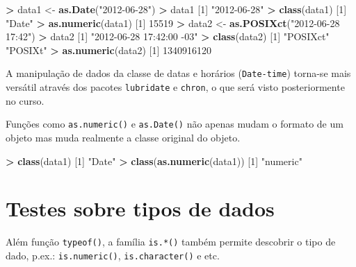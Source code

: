 \documentclass[]{book}
\newenvironment{Shaded}{\begin{snugshade}}{\end{snugshade}}
\newcommand{\KeywordTok}[1]{\textcolor[rgb]{0.13,0.29,0.53}{\textbf{#1}}}
\newcommand{\DecValTok}[1]{\textcolor[rgb]{0.00,0.00,0.81}{#1}}
\newcommand{\StringTok}[1]{\textcolor[rgb]{0.31,0.60,0.02}{#1}}
\newcommand{\OperatorTok}[1]{\textcolor[rgb]{0.81,0.36,0.00}{\textbf{#1}}}
\newcommand{\NormalTok}[1]{#1}
\begin{document}
\begin{Shaded}
\begin{Highlighting}[]
\OperatorTok{>}\StringTok{ }\NormalTok{data1 <-}\StringTok{ }\KeywordTok{as.Date}\NormalTok{(}\StringTok{"2012-06-28"}\NormalTok{)}
\OperatorTok{>}\StringTok{ }\NormalTok{data1}
\NormalTok{[}\DecValTok{1}\NormalTok{] }\StringTok{"2012-06-28"}
\OperatorTok{>}\StringTok{ }\KeywordTok{class}\NormalTok{(data1)}
\NormalTok{[}\DecValTok{1}\NormalTok{] }\StringTok{"Date"}
\OperatorTok{>}\StringTok{ }\KeywordTok{as.numeric}\NormalTok{(data1)}
\NormalTok{[}\DecValTok{1}\NormalTok{] }\DecValTok{15519}
\OperatorTok{>}\StringTok{ }\NormalTok{data2 <-}\StringTok{ }\KeywordTok{as.POSIXct}\NormalTok{(}\StringTok{"2012-06-28 17:42"}\NormalTok{)}
\OperatorTok{>}\StringTok{ }\NormalTok{data2}
\NormalTok{[}\DecValTok{1}\NormalTok{] }\StringTok{"2012-06-28 17:42:00 -03"}
\OperatorTok{>}\StringTok{ }\KeywordTok{class}\NormalTok{(data2)}
\NormalTok{[}\DecValTok{1}\NormalTok{] }\StringTok{"POSIXct"} \StringTok{"POSIXt"} 
\OperatorTok{>}\StringTok{ }\KeywordTok{as.numeric}\NormalTok{(data2)}
\NormalTok{[}\DecValTok{1}\NormalTok{] }\DecValTok{1340916120}
\end{Highlighting}
\end{Shaded}

A manipulação de dados da classe de datas e horários
(\texttt{Date-time}) torna-se mais versátil através dos pacotes
\texttt{lubridate} e \texttt{chron}, o que será visto posteriormente no
curso.

Funções como \texttt{as.numeric()} e \texttt{as.Date()} não apenas mudam
o formato de um objeto mas muda realmente a classe original do objeto.

\begin{Shaded}
\begin{Highlighting}[]
\OperatorTok{>}\StringTok{ }\KeywordTok{class}\NormalTok{(data1)}
\NormalTok{[}\DecValTok{1}\NormalTok{] }\StringTok{"Date"}
\OperatorTok{>}\StringTok{ }\KeywordTok{class}\NormalTok{(}\KeywordTok{as.numeric}\NormalTok{(data1))}
\NormalTok{[}\DecValTok{1}\NormalTok{] }\StringTok{"numeric"}
\end{Highlighting}
\end{Shaded}

\section{Testes sobre tipos de dados}\label{testes-sobre-tipos-de-dados}

Além função \texttt{typeof()}, a família \texttt{is.*()} também permite
descobrir o tipo de dado, p.ex.: \texttt{is.numeric()},
\texttt{is.character()} e etc.
\end{document}
